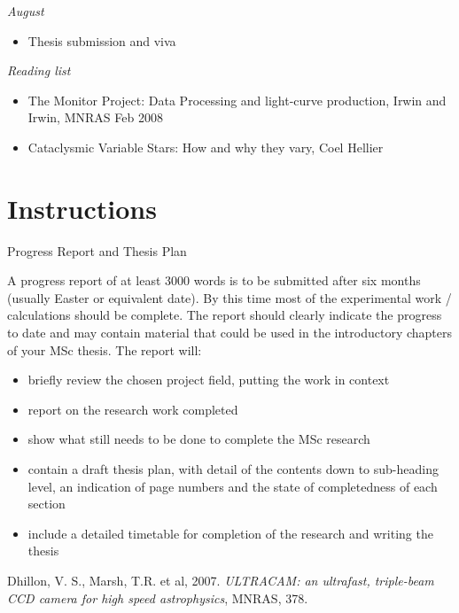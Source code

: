 \documentclass[a4paper,10pt]{article}
\begin{document}
\emph{August}
\begin{itemize} 
	\item Thesis submission and viva
\end{itemize}
	
\emph{Reading list}
\begin{itemize} 
	\item The Monitor Project: Data Processing and light-curve production, Irwin and Irwin, MNRAS Feb 2008
	\item Cataclysmic Variable Stars: How and why they vary, Coel Hellier
\end{itemize}


\section{Instructions}

Progress Report and Thesis Plan

A progress report of at least 3000 words is to be submitted after 
six months (usually Easter or equivalent date). By this time most of 
the experimental work / calculations should be complete. The report 
should clearly indicate the progress to date and may contain 
material that could be used in the introductory chapters of your MSc 
thesis. The report will:

\begin{itemize} 
\item briefly review the chosen project field, putting the work in context 
\item report on the research work completed 
\item show what still needs to be done to complete the MSc 
research 
\item contain a draft thesis plan, with detail of the 
contents down to sub-heading level, an indication of page numbers 
and the state of completedness of each section 
\item include a detailed timetable for completion of the research and writing the 
thesis \end{itemize}

\begin{thebibliography}{10}
	Dhillon, V. S., Marsh, T.R. et al, 2007. \emph{ULTRACAM: an ultrafast, triple-beam CCD camera for high speed astrophysics}, MNRAS, 378.
\end{thebibliography}
\end{document}
